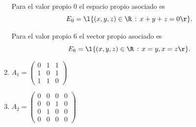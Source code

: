 \documentclass[10pt,a4]{examenEPN}
\begin{document}
\begin{preguntas}
\begin{multicols}{2}
\begin{enumerate}
\begin{respuesta}
Para el valor propio 0 el espacio propio asociado es
\[
    E_{0} = \l\{(x,y,z)\in\R\,:\,x + y + z = 0\r\}.
\]

Para el valor propio 6 el vector propio asociado es
\[
    E_{6} = \l\{(x,y,z)\in\R\,:\,x = y, x = z \r\}.
\]
\end{respuesta}
\item $A_{1} = \begin{pmatrix}0&1&1\\1&0&1\\1&1&0\end{pmatrix}$
\item $A_{2} = \begin{pmatrix}0&0&0&0\\0&0&1&0\\0&1&0&0\\0&0&0&0\end{pmatrix}$
\end{enumerate}
\end{multicols}
\final
\end{preguntas}
\end{document}
